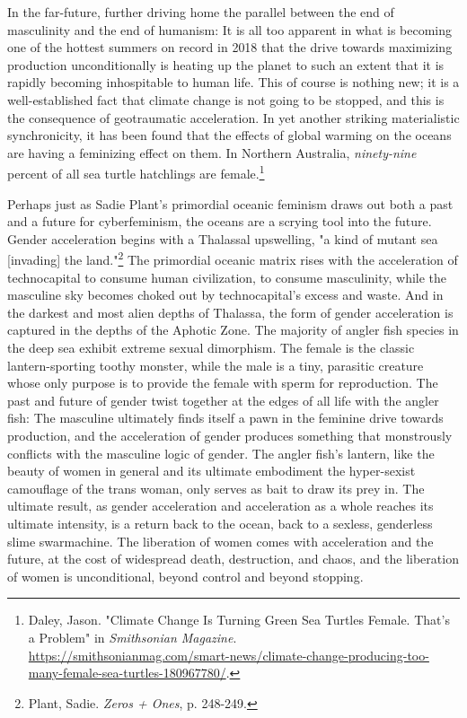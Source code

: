 \documentclass[10pt, statementpaper, twoside, openright]{memoir}
\begin{document}
In the far-future, further driving home the parallel between the end of masculinity and the end of humanism: It is all too apparent in what is becoming one of the hottest summers on record in 2018 that the drive towards maximizing production unconditionally is heating up the planet to such an extent that it is rapidly becoming inhospitable to human life. This of course is nothing new; it is a well-established fact that climate change is not going to be stopped, and this is the consequence of geotraumatic acceleration. In yet another striking materialistic synchronicity, it has been found that the effects of global warming on the oceans are having a feminizing effect on them. In Northern Australia, \emph{ninety-nine} percent of all sea turtle hatchlings are female.\footnote{Daley, Jason. "Climate Change Is Turning Green Sea Turtles Female. That’s a Problem" in \textit{Smithsonian Magazine}.\\ \href{https://www.smithsonianmag.com/smart-news/climate-change-producing-too-many-female-sea-turtles-180967780/}{https://smithsonianmag.com/smart-news/climate-change-producing-too-many-female-sea-turtles-180967780/}.}

Perhaps just as Sadie Plant's primordial oceanic feminism draws out both a past and a future for cyberfeminism, the oceans are a scrying tool into the future. Gender acceleration begins with a Thalassal upswelling, "a kind of mutant sea [invading] the land."\footnote{Plant, Sadie. \textit{Zeros + Ones}, p. 248-249.} The primordial oceanic matrix rises with the acceleration of technocapital to consume human civilization, to consume masculinity, while the masculine sky becomes choked out by technocapital's excess and waste. And in the darkest and most alien depths of Thalassa, the form of gender acceleration is captured in the depths of the Aphotic Zone. The majority of angler fish species in the deep sea exhibit extreme sexual dimorphism. The female is the classic lantern-sporting toothy monster, while the male is a tiny, parasitic creature whose only purpose is to provide the female with sperm for reproduction. The past and future of gender twist together at the edges of all life with the angler fish: The masculine ultimately finds itself a pawn in the feminine drive towards production, and the acceleration of gender produces something that monstrously conflicts with the masculine logic of gender. The angler fish's lantern, like the beauty of women in general and its ultimate embodiment the hyper-sexist camouflage of the trans woman, only serves as bait to draw its prey in. The ultimate result, as gender acceleration and acceleration as a whole reaches its ultimate intensity, is a return back to the ocean, back to a sexless, genderless slime swarmachine. The liberation of women comes with acceleration and the future, at the cost of widespread death, destruction, and chaos, and the liberation of women is unconditional, beyond control and beyond stopping.
\end{document}
